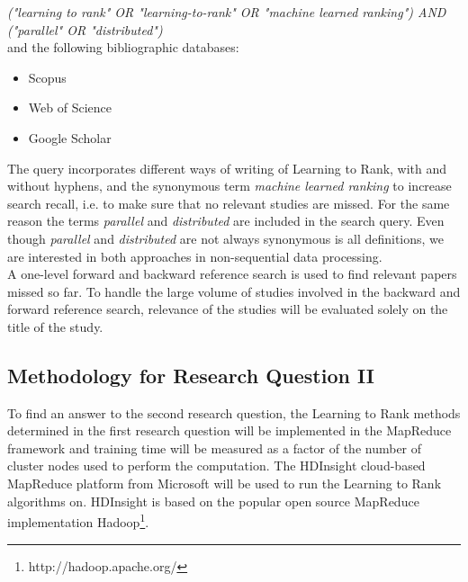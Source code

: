 \emph{("learning to rank" \emph{OR} "learning-to-rank" \emph{OR} "machine learned ranking") \emph{AND} ("parallel" \emph{OR} "distributed")}\\

and the following bibliographic databases:
\begin{itemize}
\item Scopus
\item Web of Science
\item Google Scholar
\end{itemize}

The query incorporates different ways of writing of Learning to Rank, with and without hyphens, and the synonymous term \emph{machine learned ranking} to increase search recall, i.e. to make sure that no relevant studies are missed. For the same reason the terms \emph{parallel} and \emph{distributed} are included in the search query. Even though \emph{parallel} and \emph{distributed} are not always synonymous is all definitions, we are interested in both approaches in non-sequential data processing.\\

A one-level forward and backward reference search is used to find relevant papers missed so far. To handle the large volume of studies involved in the backward and forward reference search, relevance of the studies will be evaluated solely on the title of the study.\\

\subsection{Methodology for Research Question II}
\label{ssec:rq2_methodology}
To find an answer to the second research question, the Learning to Rank methods determined in the first research question will be implemented in the MapReduce framework and training time will be measured as a factor of the number of cluster nodes used to perform the computation. The HDInsight cloud-based MapReduce platform from Microsoft will be used to run the Learning to Rank algorithms on. HDInsight is based on the popular open source MapReduce implementation Hadoop\footnote{http://hadoop.apache.org/}.\\

